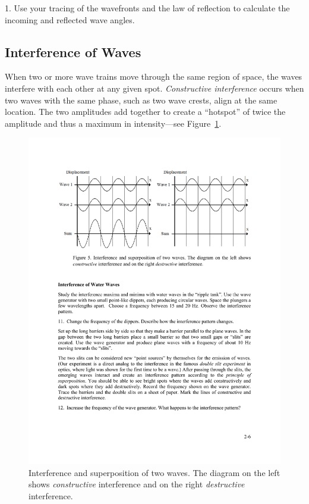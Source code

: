 \documentclass[11pt]{NSF}
\begin{document}
1.	 Use your tracing of the wavefronts and the law of reflection to calculate the incoming and reflected wave angles. 


\subsection{Interference of Waves}

When two or more wave trains move through the same region of space, the waves
interfere with each other at any given spot. 
{\em Constructive interference} occurs
when two waves with the same phase, such as two wave crests, align at the same
location. The two amplitudes add together to create a ``hotspot” of twice the
amplitude and thus a maximum in intensity---see Figure~\ref{f:5}.
%
\begin{figure}[hbtp]
\begin{center}
\includegraphics[width=.95\textwidth]{fig2_5}
\caption{Interference and superposition of two waves. 
The diagram on the left
shows {\em constructive} interference and on the right 
{\em destructive} interference.}
\label{f:5}
\end{center}
\end{figure}
%
\end{document}

